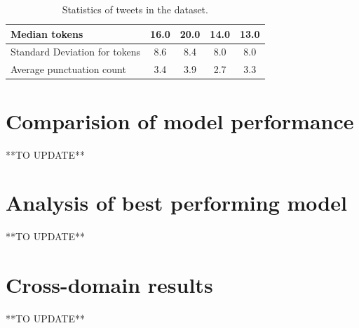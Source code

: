 \begin{table}[htbp]
\begin{tabularx}{\textwidth}{|l|c|c|c|c|}
        \hline
        Median tokens                   & 16.0                & 20.0                & 14.0                    & 13.0            \\
        \hline
        Standard Deviation for tokens   & 8.6                 & 8.4                 & 8.0                     & 8.0             \\
        \hline
        \hline
        Average punctuation count       & 3.4                 & 3.9                 & 2.7                     & 3.3             \\
        \hline
    \end{tabularx}
    \caption{Statistics of tweets in the dataset.}
    \label{tab: tweets_statistics}
\end{table}



\section{Comparision of model performance}
**TO UPDATE**

\section{Analysis of best performing model}
**TO UPDATE**

\section{Cross-domain results}
**TO UPDATE**